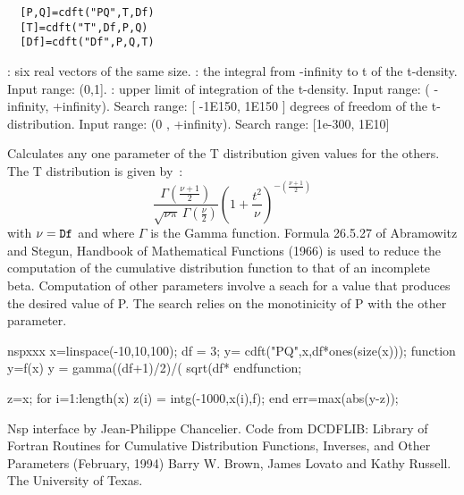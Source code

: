 \begin{mandesc}
\end{mandesc}
\label{cdft}
\begin{calling_sequence}
\begin{verbatim}
  [P,Q]=cdft("PQ",T,Df)  
  [T]=cdft("T",Df,P,Q)  
  [Df]=cdft("Df",P,Q,T)  
\end{verbatim}
\end{calling_sequence}
\begin{parameters}
  \begin{varlist}
    : six real vectors of the same size.
    : the integral from -infinity to t of the t-density. Input range: (0,1].
      : upper limit of integration of the t-density. Input range: ( -infinity, +infinity). Search range: [ -1E150, 1E150 ]
       degrees of freedom of the t-distribution. Input range: (0 , +infinity). Search range: [1e-300, 1E10]
  \end{varlist}
\end{parameters}
\begin{mandescription}
  Calculates any one parameter of the T distribution given
  values for the others. The T distribution is given by~:
  \begin{equation}
    \frac{\Gamma(\frac{\nu+1}{2})} {\sqrt{\nu\pi}\,\Gamma(\frac{\nu}{2})} \left(1+\frac{t^2}{\nu} \right)^{-(\frac{\nu+1}{2})} 
  \end{equation}
  with $\nu = \mbox{\tt Df}$  and where $\Gamma$ is the Gamma function.
  Formula  26.5.27  of   Abramowitz   and  Stegun,   Handbook   of
  Mathematical Functions  (1966) is used to reduce the computation
  of the cumulative distribution function to that of an incomplete
  beta.
  Computation of other parameters involve a seach for a value that
  produces  the desired  value  of P.   The search relies  on  the
  monotinicity of P with the other parameter.
\end{mandescription}

\begin{mintednsp}{nspxxx}
x=linspace(-10,10,100);
df = 3;
y= cdft("PQ",x,df*ones(size(x)));
function y=f(x)
  y = gamma((df+1)/2)/( sqrt(df*%
endfunction;

z=x;
for i=1:length(x)
  z(i) = intg(-1000,x(i),f);
end
err=max(abs(y-z));
\end{mintednsp}


\begin{authors}
  Nsp interface by Jean-Philippe Chancelier. Code from DCDFLIB: 
  Library of Fortran Routines for Cumulative Distribution
  Functions, Inverses, and Other Parameters (February, 1994)
  Barry W. Brown, James Lovato and Kathy Russell. The University of Texas.
\end{authors}
